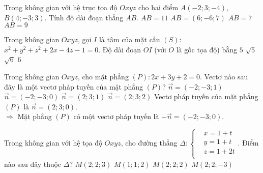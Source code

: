 \begin{ex}%
Trong không gian với hệ trục tọa độ $Oxyz$ cho hai điểm $A(-2; 3;-4)$, $B(4;-3; 3)$. Tính độ dài đoạn thẳng $AB$.
\choice
{\True $AB=11$}
{$AB=(6;-6; 7)$}
{$AB=7$}
{$AB=9$}
\end{ex}

\begin{ex}%
Trong không gian $Oxyz$, gọi $I$ là tâm của mặt cầu $(S)$: $x^2+y^2+z^2+2x-4z-1=0$. Độ dài đoạn $OI$ (với $O$ là gốc tọa độ) bằng
\choice
{$5$}
{\True $\sqrt{5}$}
{$\sqrt{6}$}
{$6$}
\end{ex}

\begin{ex}%
Trong không gian $Oxyz$, cho mặt phẳng $(P)\colon 2x+3y+2=0$. Vectơ nào sau đây là một vectơ pháp tuyến của mặt phẳng $(P)$?
\choice
{$\overrightarrow{n}=(-2;-3;1)$}
{\True $\overrightarrow{n}=(-2;-3;0)$}
{$\overrightarrow{n}=(2;3;1)$}
{$\overrightarrow{n}=(2;3;2)$}
\loigiai
{
Vectơ pháp tuyến của mặt phẳng $(P)$ là $\overrightarrow{n}=(2;3;0)$.\\
$\Rightarrow$ Mặt phẳng $(P)$ có một vectơ pháp tuyến là $-\overrightarrow{n}=(-2;-3;0)$.
}
\end{ex}

\begin{ex}%
Trong không gian với hệ tọa độ $Oxyz$, cho đường thẳng $\Delta \colon \left\{ \begin{aligned}
& x=1+t \\ & y=1+t \\ & z=1+2t \\ \end{aligned} \right.$. Điểm nào sau đây thuộc $\Delta$?
\choice
{\True $M(2;2;3)$}
{$M(1;1;2)$}
{$M(2;2;2)$}
{$M(2;2;-3)$}
\end{ex}

